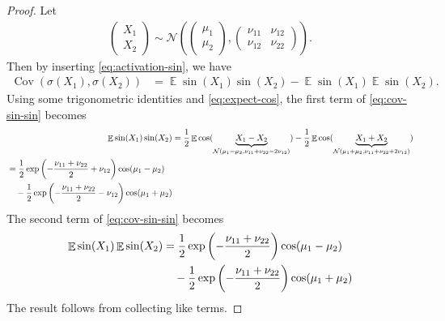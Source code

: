 \documentclass{article}
\DeclareMathOperator{\expect}{\mathbb{E}}
\DeclareMathOperator{\Cov}{\operatorname{Cov}}
\begin{document}
\begin{proof}
  Let
  \begin{align}
  \begin{pmatrix} X_1 \\ X_2 \end{pmatrix}
   \sim \mathcal N\left(\begin{pmatrix}
    \mu_1
    \\
    \mu_2
  \end{pmatrix},
  \begin{pmatrix}
    \nu_{11}
    &
    \nu_{12}
    \\
    \nu_{12}
    &
    \nu_{22}
  \end{pmatrix}\right).
  \end{align}
  Then by inserting \eqref{eq:activation-sin}, we have
  \begin{align}
    \Cov(\sigma(X_1), \sigma(X_2))
    &= \expect \sin(X_1) \sin(X_2) - \expect \sin(X_1) \expect \sin(X_2).
    \label{eq:cov-sin-sin}
  \end{align}
  Using some trigonometric identities and \eqref{eq:expect-cos}, the first term of \eqref{eq:cov-sin-sin} becomes
  \begin{align}
    \expect \sin(X_1) \sin(X_2)
    &= \frac{1}{2} \expect \cos(\underbrace{X_1 - X_2}_{
      \mathcal N(\mu_1 - \mu_2, \nu_{11} + \nu_{22} - 2\nu_{12})
      })
    - \frac{1}{2} \expect \cos(\underbrace{X_1 + X_2}_{\mathcal N(\mu_1 + \mu_2, \nu_{11} + \nu_{22} + 2\nu_{12})})
    \\
    \begin{split}
      &= \frac{1}{2} \exp\del{-\frac{\nu_{11} + \nu_{22}}{2} + \nu_{12}} \cos(\mu_1 - \mu_2) \\
      &\quad - \frac{1}{2} \exp\del{ -\frac{\nu_{11} + \nu_{22}}{2} - \nu_{12}} \cos(\mu_1 + \mu_2)
    \end{split}
  \end{align}
  The second term of \eqref{eq:cov-sin-sin} becomes
  \begin{align}
    \begin{split}
      \expect \sin(X_1) \expect \sin(X_2)
      &= \frac{1}{2} \exp\del{-\frac{\nu_{11} + \nu_{22}}{2}} \cos(\mu_1 - \mu_2) \\
      &\quad - \frac{1}{2} \exp\del{ -\frac{\nu_{11} + \nu_{22}}{2}} \cos(\mu_1 + \mu_2)
    \end{split}
  \end{align}
  The result follows from collecting like terms.
\end{proof}
\end{document}
